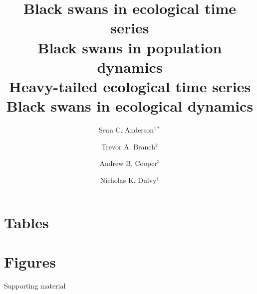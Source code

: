 \documentclass[12pt]{article}
\title{Black swans in ecological time series\\Black swans in population dynamics\\Heavy-tailed ecological time series\\Black swans in ecological dynamics}
\author{
Sean C. Anderson$^{1\ast}$ \and
Trevor A. Branch$^2$ \and
Andrew B. Cooper$^3$ \and
Nicholas K. Dulvy$^1$
}
\date{}
\begin{document}

\onehalfspacing

\maketitle
\thispagestyle{empty}




%

\clearpage
\section{Tables}



\clearpage
\section{Figures}



\begin{centering}
\LARGE
Supporting material\\[1.5em]
\end{centering}




\end{document}
